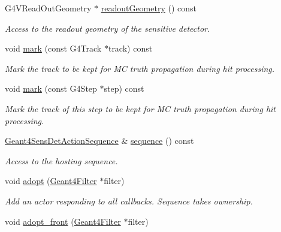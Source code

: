 \begin{DoxyCompactItemize}
G4VReadOutGeometry $\ast$ \hyperlink{class_d_d4hep_1_1_simulation_1_1_geant4_sensitive_a86be000830d41ed4aa72b0dad36875b2}{readoutGeometry} () const 
\begin{DoxyCompactList}\small\item\em Access to the readout geometry of the sensitive detector. \item\end{DoxyCompactList}\item 
void \hyperlink{class_d_d4hep_1_1_simulation_1_1_geant4_sensitive_ab5c51f863ef61aa15b89fd88f6709e70}{mark} (const G4Track $\ast$track) const 
\begin{DoxyCompactList}\small\item\em Mark the track to be kept for MC truth propagation during hit processing. \item\end{DoxyCompactList}\item 
void \hyperlink{class_d_d4hep_1_1_simulation_1_1_geant4_sensitive_ae241043b3ab258a666370d07b4d69f68}{mark} (const G4Step $\ast$step) const 
\begin{DoxyCompactList}\small\item\em Mark the track of this step to be kept for MC truth propagation during hit processing. \item\end{DoxyCompactList}\item 
\hyperlink{class_d_d4hep_1_1_simulation_1_1_geant4_sens_det_action_sequence}{Geant4SensDetActionSequence} \& \hyperlink{class_d_d4hep_1_1_simulation_1_1_geant4_sensitive_a26950a2a0d717423dfef6d3bfe520677}{sequence} () const 
\begin{DoxyCompactList}\small\item\em Access to the hosting sequence. \item\end{DoxyCompactList}\item 
void \hyperlink{class_d_d4hep_1_1_simulation_1_1_geant4_sensitive_ac1a68f5a62579041a301c8f3b3389175}{adopt} (\hyperlink{class_d_d4hep_1_1_simulation_1_1_geant4_filter}{Geant4Filter} $\ast$filter)
\begin{DoxyCompactList}\small\item\em Add an actor responding to all callbacks. Sequence takes ownership. \item\end{DoxyCompactList}\item 
void \hyperlink{class_d_d4hep_1_1_simulation_1_1_geant4_sensitive_a38dc5d69581c1acf08eb7aed152cf3f6}{adopt\_\-front} (\hyperlink{class_d_d4hep_1_1_simulation_1_1_geant4_filter}{Geant4Filter} $\ast$filter)

\end{DoxyCompactItemize}

